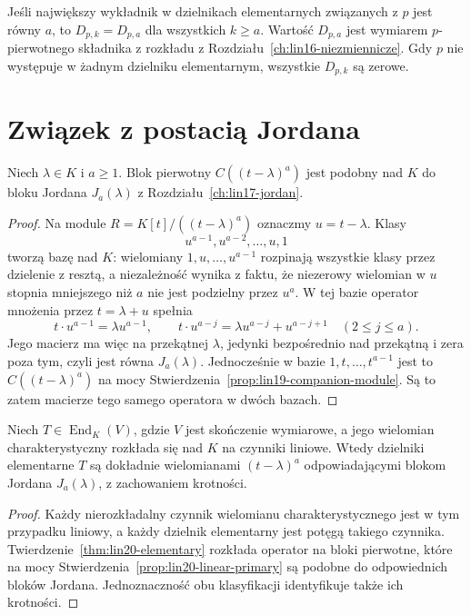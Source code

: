 \begin{uwaga}
\label{rem:lin20-kernel-stabilization}
Jeśli największy wykładnik
w dzielnikach elementarnych
związanych z \(p\) jest równy \(a\),
to \(D_{p,k}=D_{p,a}\) dla wszystkich
\(k\ge a\).
Wartość \(D_{p,a}\) jest wymiarem
\(p\)-pierwotnego składnika z rozkładu
z Rozdziału~\ref{ch:lin16-niezmiennicze}.
Gdy \(p\) nie występuje
w żadnym dzielniku elementarnym,
wszystkie \(D_{p,k}\) są zerowe.
\end{uwaga}

\section{Związek z postacią Jordana}
\label{sec:lin20-jordan}

\begin{stwierdzenie}
\label{prop:lin20-linear-primary}
Niech \(\lambda\in K\) i \(a\ge1\).
Blok pierwotny \(C((t-\lambda)^a)\)
jest podobny nad \(K\)
do bloku Jordana \(J_a(\lambda)\)
z Rozdziału~\ref{ch:lin17-jordan}.
\end{stwierdzenie}
\begin{proof}
Na module \(R=K[t]/((t-\lambda)^a)\)
oznaczmy \(u=t-\lambda\).
Klasy
\[
 u^{a-1},u^{a-2},\ldots,u,1
\]
tworzą bazę nad \(K\):
wielomiany \(1,u,\ldots,u^{a-1}\)
rozpinają wszystkie klasy przez dzielenie
z resztą, a niezależność wynika z faktu,
że niezerowy wielomian w \(u\)
stopnia mniejszego niż \(a\)
nie jest podzielny przez \(u^a\).
W tej bazie operator mnożenia przez
\(t=\lambda+u\) spełnia
\[
 t\cdot u^{a-1}=\lambda u^{a-1},
 \qquad
 t\cdot u^{a-j}
   =\lambda u^{a-j}+u^{a-j+1}
       \quad(2\le j\le a).
\]
Jego macierz ma więc na przekątnej
\(\lambda\), jedynki bezpośrednio
nad przekątną i zera poza tym,
czyli jest równa \(J_a(\lambda)\).
Jednocześnie w bazie
\(1,t,\ldots,t^{a-1}\) jest to
\(C((t-\lambda)^a)\)
na mocy Stwierdzenia~\ref{prop:lin19-companion-module}.
Są to zatem macierze tego samego
operatora w dwóch bazach.
\end{proof}

\begin{wniosek}
\label{cor:lin20-jordan}
Niech \(T\in\operatorname{End}_K(V)\),
gdzie \(V\) jest skończenie wymiarowe,
a jego wielomian charakterystyczny
rozkłada się nad \(K\) na czynniki liniowe.
Wtedy dzielniki elementarne \(T\)
są dokładnie wielomianami
\((t-\lambda)^a\) odpowiadającymi
blokom Jordana \(J_a(\lambda)\),
z zachowaniem krotności.
\end{wniosek}
\begin{proof}
Każdy nierozkładalny czynnik
wielomianu charakterystycznego
jest w tym przypadku liniowy,
a każdy dzielnik elementarny
jest potęgą takiego czynnika.
Twierdzenie~\ref{thm:lin20-elementary}
rozkłada operator na bloki pierwotne,
które na mocy
Stwierdzenia~\ref{prop:lin20-linear-primary}
są podobne do odpowiednich
bloków Jordana.
Jednoznaczność obu klasyfikacji
identyfikuje także ich krotności.
\end{proof}

